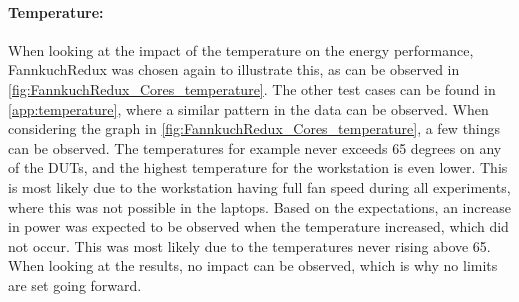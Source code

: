 

\paragraph{Temperature:} When looking at the impact of the temperature on the energy performance, FannkuchRedux was chosen again to illustrate this, as can be observed in \cref{fig:FannkuchRedux_Cores_temperature}. The other test cases can be found in \cref{app:temperature}, where a similar pattern in the data can be observed. When considering the graph in \cref{fig:FannkuchRedux_Cores_temperature}, a few things can be observed. The temperatures for example never exceeds 65 degrees on any of the DUTs, and the highest temperature for the workstation is even lower. This is most likely due to the workstation having full fan speed during all experiments, where this was not possible in the laptops. Based on the expectations, an increase in power was expected to be observed when the temperature increased, which did not occur. This was most likely due to the temperatures never rising above 65. When looking at the results, no impact can be observed, which is why no limits are set going forward.





